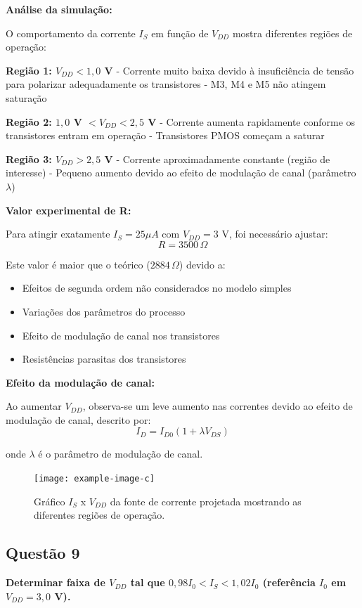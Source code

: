﻿\documentclass[12pt,a4paper]{article}
\begin{document}
\textbf{Análise da simulação:}

O comportamento da corrente $I_S$ em função de $V_{DD}$ mostra diferentes regiões de operação:

\textbf{Região 1: $V_{DD} < 1,0$ V}
- Corrente muito baixa devido à insuficiência de tensão para polarizar adequadamente os transistores
- M3, M4 e M5 não atingem saturação

\textbf{Região 2: $1,0$ V $< V_{DD} < 2,5$ V}
- Corrente aumenta rapidamente conforme os transistores entram em operação
- Transistores PMOS começam a saturar

\textbf{Região 3: $V_{DD} > 2,5$ V}
- Corrente aproximadamente constante (região de interesse)
- Pequeno aumento devido ao efeito de modulação de canal (parâmetro $\lambda$)

\textbf{Valor experimental de R:}

Para atingir exatamente $I_S = 25 \mu A$ com $V_{DD} = 3$ V, foi necessário ajustar:
$$R = 3500 \, \Omega$$

Este valor é maior que o teórico ($2884 \, \Omega$) devido a:
\begin{itemize}
    \item Efeitos de segunda ordem não considerados no modelo simples
    \item Variações dos parâmetros do processo
    \item Efeito de modulação de canal nos transistores
    \item Resistências parasitas dos transistores
\end{itemize}

\textbf{Efeito da modulação de canal:}

Ao aumentar $V_{DD}$, observa-se um leve aumento nas correntes devido ao efeito de modulação de canal, descrito por:
$$I_D = I_{D0}(1 + \lambda V_{DS}) $$

onde $\lambda$ é o parâmetro de modulação de canal.

\begin{figure}[H]
    \centering
    \texttt{[image: example-image-c]}
    \caption{Gráfico $I_S$ x $V_{DD}$ da fonte de corrente projetada mostrando as diferentes regiões de operação.}
    \label{fig:is_vdd}
\end{figure}

\subsection*{Questão 9}
	\textbf{Determinar faixa de $V_{DD}$ tal que $0{,}98 I_0 < I_S < 1{,}02 I_0$ (referência $I_0$ em $V_{DD}=3{,}0$ V).}
\end{document}
